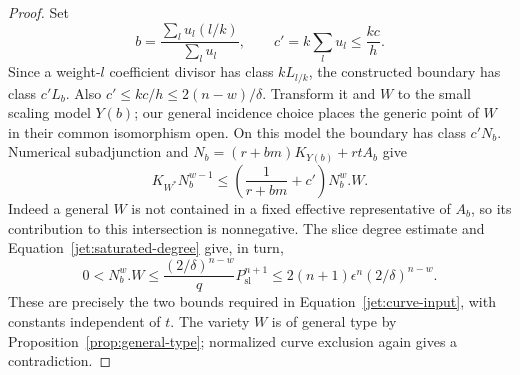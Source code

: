 \begin{proof}
Set
\[
 b=\frac{\sum_lu_l(l/k)}{\sum_lu_l},
 \qquad c'=k\sum_lu_l\le\frac{kc}{h}.
\]
Since a weight-\(l\) coefficient divisor has class \(kL_{l/k}\),
the constructed boundary has class \(c'L_b\). Also
\(c'\le kc/h\le2(n-w)/\delta\). Transform it and \(W\) to the small
scaling model \(Y(b)\); our general incidence choice places the
generic point of \(W\) in their common isomorphism open. On this
model the boundary has class \(c'N_b\). Numerical subadjunction
and \(N_b=(r+bm)K_{Y(b)}+rtA_b\) give
\[
 K_{W^*}N_b^{w-1}
 \le\left(\frac1{r+bm}+c'\right)N_b^w.W.
\]
Indeed a general \(W\) is not contained in a fixed effective
representative of \(A_b\), so its contribution to this intersection
is nonnegative. The slice degree estimate and
Equation~\eqref{jet:saturated-degree} give, in turn,
\[
 0<N_b^w.W
 \le\frac{(2/\delta)^{n-w}}q P_{\mathrm{sl}}^{n+1}
 \le2(n+1)\epsilon^n(2/\delta)^{n-w}.
\]
These are precisely the two bounds required in
Equation~\eqref{jet:curve-input}, with constants independent of \(t\).
The variety \(W\) is of general type by
Proposition~\ref{prop:general-type}; normalized curve exclusion
again gives a contradiction.


\end{proof}
